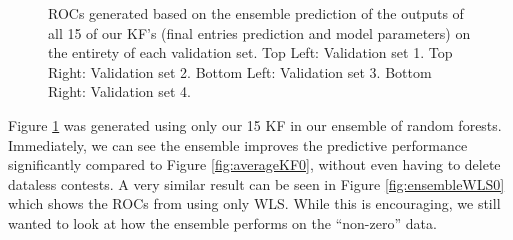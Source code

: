 \begin{figure}[h]
\caption{ROCs generated based on the ensemble prediction of the outputs of all 15 of our KF's (final entries prediction and model parameters) on the entirety of each validation set. Top Left: Validation set 1. Top Right: Validation set 2. Bottom Left: Validation set 3. Bottom Right: Validation set 4.}
\label{fig:ensembleKF0}
\end{figure}

Figure \ref{fig:ensembleKF0} was generated using only our 15 KF in our ensemble of random forests. Immediately, we can see the ensemble improves the predictive performance significantly compared to Figure \ref{fig:averageKF0}, without even having to delete dataless contests. A very similar result can be seen in Figure \ref{fig:ensembleWLS0} which shows the ROCs from using only WLS. While this is encouraging, we still wanted to look at how the ensemble performs on the ``non-zero'' data. 

\pagebreak


